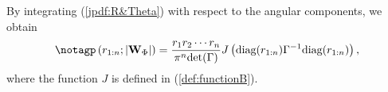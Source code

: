 \documentclass{amsart}
\begin{document}
By  integrating  (\ref{jpdf:R&Theta}) with respect to the angular components, we obtain
\begin{align}\notag%
p\left(r_{1:n};|\mathbf{W}_{\Phi}|\right)
=
\frac{r_{1}r_{2}\cdots r_{n}}{\pi^{n}\textup{det}(\Gamma)}
J\left(\textup{diag}(r_{1:n})\Gamma^{-1}\textup{diag}(r_{1:n})\right),
\end{align}
where the function $J$ is  defined in (\ref{def:functionB}).
\end{document}
